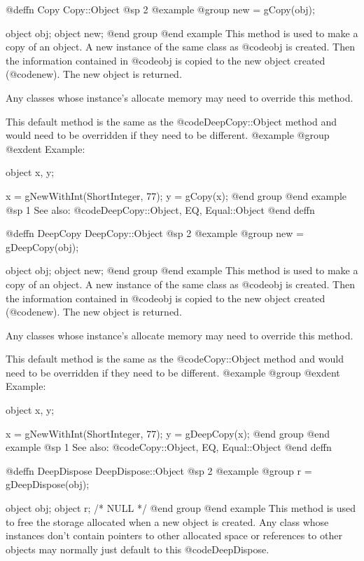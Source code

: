@deffn {Copy} Copy::Object
@sp 2
@example
@group
new = gCopy(obj);

object  obj;
object  new;
@end group
@end example
This method is used to make a copy of an object.  A new instance
of the same class as @code{obj} is created.  Then the information
contained in @code{obj} is copied to the new object created (@code{new}).
The new object is returned.

Any classes whose instance's allocate memory may need to override this method.

This default method is the same as the @code{DeepCopy::Object} method and
would need to be overridden if they need to be different.
@example
@group
@exdent Example:

object  x, y;

x = gNewWithInt(ShortInteger, 77);
y = gCopy(x);
@end group
@end example
@sp 1
See also:  @code{DeepCopy::Object, EQ, Equal::Object}
@end deffn












@deffn {DeepCopy} DeepCopy::Object
@sp 2
@example
@group
new = gDeepCopy(obj);

object  obj;
object  new;
@end group
@end example
This method is used to make a copy of an object.  A new instance
of the same class as @code{obj} is created.  Then the information
contained in @code{obj} is copied to the new object created (@code{new}).
The new object is returned.

Any classes whose instance's allocate memory may need to override this method.

This default method is the same as the @code{Copy::Object} method and
would need to be overridden if they need to be different.
@example
@group
@exdent Example:

object  x, y;

x = gNewWithInt(ShortInteger, 77);
y = gDeepCopy(x);
@end group
@end example
@sp 1
See also:  @code{Copy::Object, EQ, Equal::Object}
@end deffn









@deffn {DeepDispose} DeepDispose::Object
@sp 2
@example
@group
r = gDeepDispose(obj);

object  obj;
object  r;     /*  NULL  */
@end group
@end example
This method is used to free the storage allocated when a new object is
created.  Any class whose instances don't contain pointers to other
allocated space or references to other objects may normally just default
to this @code{DeepDispose}.


